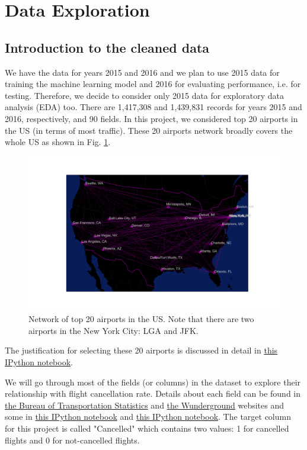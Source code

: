 \documentclass[12pt]{article}
\begin{document}
\section{Data Exploration}
\label{sec:eda}
\subsection{Introduction to the cleaned data}
\label{subsec:dataintro}
We have the data for years 2015 and 2016 and we plan to use 2015 data for training the machine learning model and 2016 for evaluating performance, i.e. for testing. Therefore, we decide to consider only 2015 data for exploratory data analysis (EDA) too. There are 1,417,308 and 1,439,831 records for years 2015 and 2016, respectively, and 90 fields. In this project, we considered top 20 airports in the US (in terms of most traffic). These 20 airports network broadly covers the whole US as shown in Fig. \ref{fig:map}. 
\begin{figure}[h!]
\begin{center}
\includegraphics[width=6in]{map.pdf}
\end{center}
\caption{\label{fig:map}
Network of top 20 airports in the US. Note that there are two airports in the New York City: LGA and JFK.}
\end{figure}
The justification for selecting these 20 airports is discussed in detail in \href{https://github.com/aajains/springboard-datascience-intensive/blob/master/capstone_project/DataAcquisitionMerging/data_acquisition_merging.ipynb}{this IPython notebook}. 


We will go through most of the fields (or columns) in the dataset to explore their relationship with flight cancellation rate. Details about each field can be found in \href{https://www.transtats.bts.gov/Fields.asp?Table_ID=236}{the Bureau of Transportation Statistics} and \href{https://www.wunderground.com/weather/api/d/docs?d=resources/phrase-glossary}{the Wunderground} websites and some in \href{https://github.com/aajains/springboard-datascience-intensive/blob/master/capstone_project/DataAcquisitionMerging/history_calc.ipynb}{this IPython notebook} and \href{https://github.com/aajains/springboard-datascience-intensive/blob/master/capstone_project/DataCleaning/data_cleaning.ipynb}{this IPython notebook}. The target column for this project is called  "Cancelled" which contains two values: 1 for cancelled flights and 0 for not-cancelled flights. 
\end{document}
